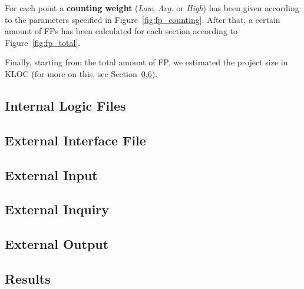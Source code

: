 For each point a \textbf{counting weight} (\emph{Low}, \emph{Avg.} or \emph{High}) has been given according to the parameters specified in Figure~\ref{fig:fp_counting}. After that, a certain amount of FPs has been calculated for each section according to Figure~\ref{fig:fp_total}.

Finally, starting from the total amount of FP, we estimated the project size in KLOC (for more on this, see Section~\ref{sub:results}).

\subsection{Internal Logic Files} %
\label{sub:ilf}

\subsection{External Interface File} %
\label{sub:elf}

\subsection{External Input} %
\label{sub:ei}

\subsection{External Inquiry} %
\label{sub:eiq}

\subsection{External Output} %
\label{sub:eo}

\subsection{Results} %
\label{sub:results}
